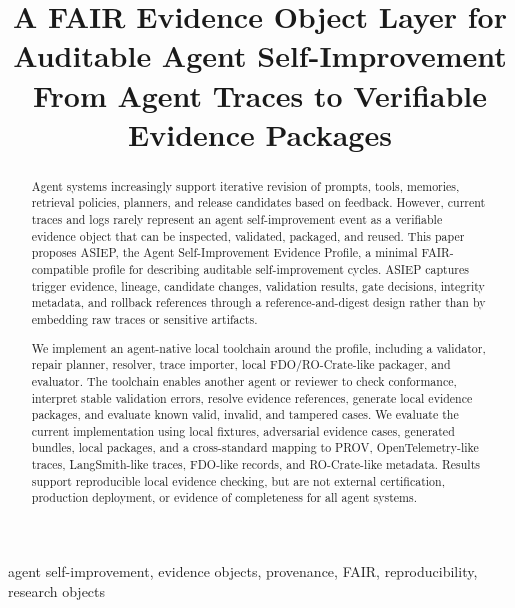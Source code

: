 \documentclass[conference]{IEEEtran}
\title{A FAIR Evidence Object Layer for Auditable Agent Self-Improvement\\
\large From Agent Traces to Verifiable Evidence Packages}
\author{
\IEEEauthorblockN{Zhang Bin}
\IEEEauthorblockA{
Independent Researcher\\
ORCID: 0009-0002-8861-1481\\
Email: joy7759@gmail.com
}
}
\begin{document}
\maketitle

\begin{abstract}
Agent systems increasingly support iterative revision of prompts, tools, memories, retrieval policies, planners, and release candidates based on feedback. However, current traces and logs rarely represent an agent self-improvement event as a verifiable evidence object that can be inspected, validated, packaged, and reused. This paper proposes ASIEP, the Agent Self-Improvement Evidence Profile, a minimal FAIR-compatible profile for describing auditable self-improvement cycles. ASIEP captures trigger evidence, lineage, candidate changes, validation results, gate decisions, integrity metadata, and rollback references through a reference-and-digest design rather than by embedding raw traces or sensitive artifacts.

We implement an agent-native local toolchain around the profile, including a validator, repair planner, resolver, trace importer, local FDO/RO-Crate-like packager, and evaluator. The toolchain enables another agent or reviewer to check conformance, interpret stable validation errors, resolve evidence references, generate local evidence packages, and evaluate known valid, invalid, and tampered cases. We evaluate the current implementation using local fixtures, adversarial evidence cases, generated bundles, local packages, and a cross-standard mapping to PROV, OpenTelemetry-like traces, LangSmith-like traces, FDO-like records, and RO-Crate-like metadata. Results support reproducible local evidence checking, but are not external certification, production deployment, or evidence of completeness for all agent systems.
\end{abstract}

\begin{IEEEkeywords}
agent self-improvement, evidence objects, provenance, FAIR, reproducibility, research objects
\end{IEEEkeywords}















\end{document}

